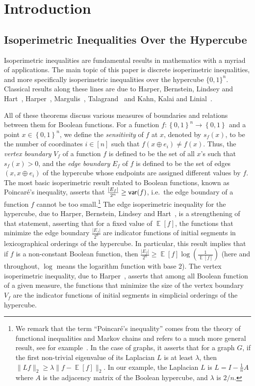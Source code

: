 \documentclass[10pt]{article}
\newcommand{\E}{\mathop{\mathbb E}}
\newcommand{\card}[1]{\left\lvert #1\right\rvert}
\newcommand{\set}[1]{{\left\{#1\right\}}}
\newcommand{\norm}[1]{\lVert #1\rVert}
\newcommand{\power}[1]{\set{0,1}^{#1}}
\begin{document}
\section{Introduction}
\subsection{Isoperimetric Inequalities Over the Hypercube}
Isoperimetric inequalities are fundamental results in mathematics with a myriad of applications. The main topic of this paper is discrete isoperimetric
inequalities, and more specifically isoperimetric inequalities over the hypercube $\{0,1\}^n$. Classical results along
these lines are due to Harper, Bernstein, Lindsey and Hart~\cite{Harper2,Bernstein,Lindsey,Hart}, Harper~\cite{Harper2}, Margulis~\cite{Margulis}, Talagrand~\cite{Tal1,Tal2,Tal4} and Kahn, Kalai and Linial~\cite{KKL}.

All of these theorems discuss various measures of boundaries and relations between them for Boolean functions.
For a function $f\colon\power{n}\to\power{}$ and a point $x\in\power{n}$, we define the \emph{sensitivity} of $f$ at $x$, denoted by $s_f(x)$,
to be the number of coordinates $i\in[n]$ such that $f(x\oplus e_i)\neq f(x)$. Thus, the \emph{vertex boundary} $V_f$ of a function $f$ is defined to be the set
of all $x$'s such that $s_f(x) > 0$, and the \emph{edge boundary} $E_f$ of $f$ is defined to be the set of edges $(x,x\oplus e_i)$ of the hypercube whose
endpoints are assigned different values by $f$. The most basic isoperimetric result related to Boolean functions,
known as Poincar\'{e}'s inequality, asserts that $\frac{\card{E_f}}{2^n}\geq {\sf var}(f)$,
i.e.\ the edge boundary of a function $f$ cannot be too small.\footnote{We remark that the term ``Poincar\'{e}'s inequality'' comes from the theory of functional inequalities
and Markov chains and refers to a much more general result, see for example~\cite[Section 2]{kitsos2014inequalities}. In the case of graphs, it asserts that for a graph
$G$, if the first non-trivial eigenvalue of its Laplacian $L$ is at least $\lambda$, then $\norm{L f}_2\geq \lambda \norm{f-\E[f]}_2$. In our
example, the Laplacian $L$ is $L = I-\frac{1}{n} A$ where $A$ is the adjacency matrix of the Boolean hypercube, and $\lambda$ is $2/n$.}
The edge isoperimetric inequality for the hypercube, due to Harper, Bernstein, Lindsey and Hart~\cite{Harper2,Bernstein,Lindsey,Hart}, is a strengthening
of that statement, asserting that for a fixed value of $\E[f]$, the functions that minimize the edge boundary $\frac{\card{E_f}}{2^n}$
are indicator functions
of initial segments in lexicographical orderings of the hypercube. In particular, this result implies that if $f$ is a non-constant Boolean function, then $\frac{\card{E_f}}{2^n}\geq \E[f]\log\left(\frac{1}{\E[f]}\right)$
(here and throughout, $\log$ means the logarithm function with base $2$). The vertex isoperimetric inequality, due to Harper~\cite{Harper2}, asserts that among all Boolean function
of a given measure, the functions that minimize the size of the vertex boundary $V_f$ are the indicator functions of
initial segments in simplicial orderings of the hypercube.
\end{document}
